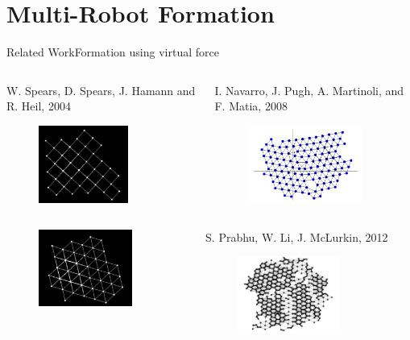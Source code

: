 \documentclass[10pt]{beamer}
\begin{document}
\section{Multi-Robot Formation}
\begin{frame}{Related Work}{Formation using virtual force}
   \begin{columns}[T] 
    \begin{column}{.45\textwidth}
      \scriptsize{W. Spears, D. Spears, J. Hamann and R. Heil, 2004}
      \begin{figure}
        \centering
        \includegraphics[height=1in]{figs/spears1.png}
      \end{figure}
    \end{column}%
    \begin{column}{.45\textwidth}
      \scriptsize{I. Navarro, J. Pugh, A. Martinoli, and
        F. Matia, 2008}
      \begin{figure}
        \centering
        \includegraphics[height=1in]{figs/navarro.png}
      \end{figure}      
    \end{column}
  \end{columns}
  \vspace{3mm}
  \begin{columns}[T] 
    \begin{column}{.45\textwidth}
      \begin{figure}
        \centering
        \includegraphics[height=1in]{figs/spears2.png}     
      \end{figure}  
    \end{column}%
    \begin{column}{.45\textwidth}
      \scriptsize{S. Prabhu, W. Li, J. McLurkin, 2012}
      \begin{figure}
        \centering
        \includegraphics[height=1in]{figs/james.png}
      \end{figure}
    \end{column}
  \end{columns}
\end{frame}
\end{document}
